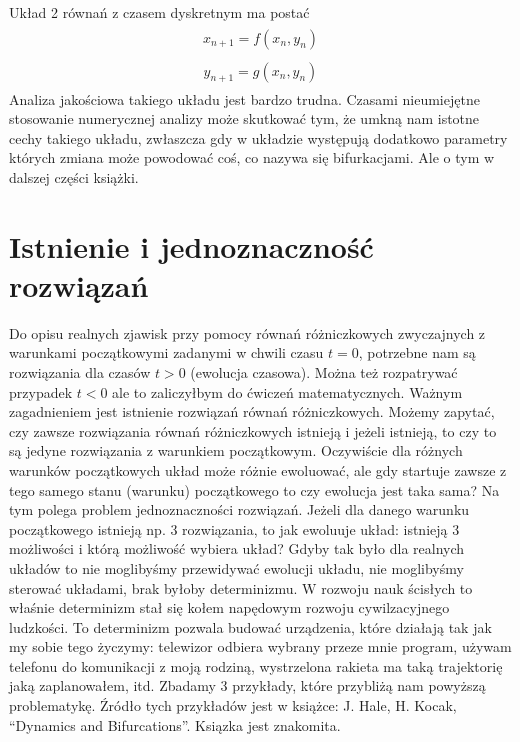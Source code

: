 \documentclass[a4paper,12pt,polish]{sphinxmanual}
\begin{document}
Układ 2 równań z czasem dyskretnym ma postać
\label{ch1/chI011:equation-eqn32}\begin{gather}
\begin{split}x_{n+1} = f(x_n, y_n)\end{split}\label{ch1/chI011-eqn32}
\end{gather}\label{ch1/chI011:equation-eqn33}\begin{gather}
\begin{split}y_{n+1} = g(x_n, y_n)\end{split}\label{ch1/chI011-eqn33}
\end{gather}
Analiza jakościowa takiego układu jest bardzo trudna. Czasami  nieumiejętne stosowanie numerycznej analizy może skutkować tym, że umkną nam istotne cechy takiego układu, zwłaszcza gdy w układzie  występują dodatkowo  parametry których zmiana może powodować coś, co nazywa się bifurkacjami.  Ale o tym w dalszej części książki.


\section{Istnienie i jednoznaczność rozwiązań}
\label{ch1/chI012:istnienie-i-jednoznacznosc-rozwiazan}\label{ch1/chI012::doc}
Do opisu  realnych zjawisk przy pomocy równań różniczkowych zwyczajnych z warunkami początkowymi zadanymi w chwili  czasu $t=0$, potrzebne nam są rozwiązania dla czasów $t>0$ (ewolucja czasowa).  Można też rozpatrywać przypadek $t<0$ ale to zaliczyłbym do ćwiczeń matematycznych.  Ważnym zagadnieniem jest istnienie rozwiązań równań różniczkowych. Możemy zapytać, czy zawsze rozwiązania równań różniczkowych istnieją i jeżeli istnieją, to czy to są jedyne rozwiązania z warunkiem początkowym. Oczywiście dla różnych warunków początkowych układ może różnie ewoluować, ale gdy startuje  zawsze z tego samego  stanu (warunku) początkowego to czy ewolucja jest taka sama? Na tym polega problem jednoznaczności rozwiązań. Jeżeli dla danego warunku początkowego istnieją  np. 3 rozwiązania, to jak ewoluuje układ: istnieją 3 możliwości i którą możliwość wybiera układ? Gdyby tak było dla realnych układów to nie moglibyśmy przewidywać ewolucji układu, nie moglibyśmy sterować układami, brak byłoby determinizmu.  W rozwoju nauk ścisłych to właśnie determinizm stał się kołem napędowym rozwoju cywilzacyjnego ludzkości. To determinizm pozwala budować urządzenia, które działają tak jak my sobie tego życzymy: telewizor odbiera wybrany przeze mnie program, używam telefonu do komunikacji  z moją rodziną, wystrzelona rakieta ma taką trajektorię jaką zaplanowałem, itd.  Zbadamy 3 przykłady, które przybliżą nam powyższą problematykę. Źródło tych przykładów jest w  książce: J. Hale, H. Kocak, ``Dynamics and Bifurcations''. Ksiązka jest znakomita.
\end{document}
